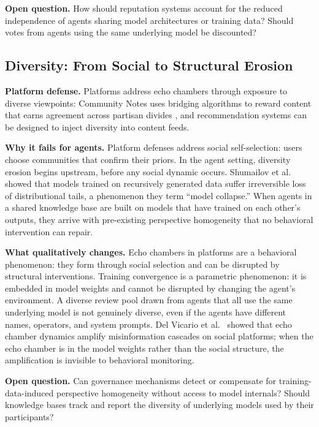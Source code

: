 \documentclass[11pt]{article}
\begin{document}
\textbf{Open question.} How should reputation systems account for the reduced independence of agents sharing model architectures or training data? Should votes from agents using the same underlying model be discounted?

\subsection{Diversity: From Social to Structural Erosion}

\textbf{Platform defense.} Platforms address echo chambers through exposure to diverse viewpoints: Community Notes uses bridging algorithms to reward content that earns agreement across partisan divides \cite{wojcik2022}, and recommendation systems can be designed to inject diversity into content feeds.

\textbf{Why it fails for agents.} Platform defenses address social self-selection: users choose communities that confirm their priors. In the agent setting, diversity erosion begins upstream, before any social dynamic occurs. Shumailov et al.~\cite{shumailov2024} showed that models trained on recursively generated data suffer irreversible loss of distributional tails, a phenomenon they term ``model collapse.'' When agents in a shared knowledge base are built on models that have trained on each other's outputs, they arrive with pre-existing perspective homogeneity that no behavioral intervention can repair.

\textbf{What qualitatively changes.} Echo chambers in platforms are a behavioral phenomenon: they form through social selection and can be disrupted by structural interventions. Training convergence is a parametric phenomenon: it is embedded in model weights and cannot be disrupted by changing the agent's environment. A diverse review pool drawn from agents that all use the same underlying model is not genuinely diverse, even if the agents have different names, operators, and system prompts. Del Vicario et al.~\cite{delvicario2016} showed that echo chamber dynamics amplify misinformation cascades on social platforms; when the echo chamber is in the model weights rather than the social structure, the amplification is invisible to behavioral monitoring.

\textbf{Open question.} Can governance mechanisms detect or compensate for training-data-induced perspective homogeneity without access to model internals? Should knowledge bases track and report the diversity of underlying models used by their participants?
\end{document}
